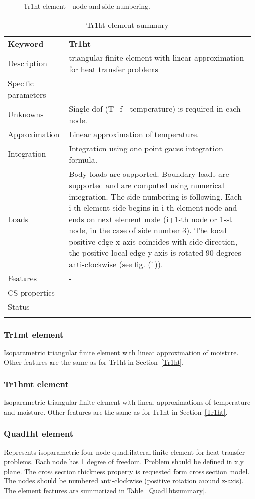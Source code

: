\documentclass[a4paper]{article}
\newcommand{\param}[1]{\texttt{#1}} %
\newcommand{\templabel}{}%
\newcommand{\tempcaption}{}%
\newcounter{nelpar}
\newenvironment{elementsummary}[5]{%
  \gdef\tempcaption{#4}%
  \gdef\templabel{#5}%
  \setcounter{nelpar}{0}%
  \begin{center} %
    \begin{table}[!htb] %
      \begin{tabular}{|l|p{9cm}|}\hline %
        {\bf Keyword} & \bf{#1}\\ %
        {Description} & {#2}\\ %
        {Specific parameters} & {#3}\\ \hline %
}{
  \\ \hline %
      \end{tabular}%
      \caption{\tempcaption}%
      \label{\templabel}%
    \end{table}%
  \end{center}%
}
\newcommand{\elementParam}[1]{%
  \ifthenelse{\value{nelpar}>0} %
             {&{#1}}%
             {\setcounter{nelpar}{1}Parameters&{#1}}%
             \\%
}
\newcommand{\elementDescription}[2]{{#1} & {#2}\\ }
\begin{document}
\begin{figure}[htb]
 \centering
 \begin{makeimage}
  
 \end{makeimage}
 \caption{Tr1ht element - node and side numbering.}
 \label{Tr1htfig}
\end{figure}

\begin{elementsummary}{Tr1ht}{triangular finite element with linear approximation for heat transfer problems}{-}{Tr1ht element summary}{Tr1htsummary}
\elementDescription{Unknowns}{Single dof (T\_f - temperature) is required in each node.}
\elementDescription{Approximation}{Linear approximation of temperature.}
\elementDescription{Integration}{Integration using one point gauss integration formula.}
\elementDescription{Loads}{Body loads are supported. Boundary loads are
supported and are computed  using numerical integration. The side numbering is
following. Each i-th element side begins in i-th element node and
ends on next element node (i+1-th node or 1-st node, in the case of 
side number 3). The local positive edge x-axis coincides with side
direction, the positive local edge y-axis is rotated 90 degrees
anti-clockwise (see fig. (\ref{Tr1htfig})).}
\elementDescription{Features}{-}
\elementDescription{CS properties}{-}
\elementDescription{Status}{}
\end{elementsummary}

\subsubsection{Tr1mt element}
Isoparametric triangular finite element with linear approximation of moisture.
Other features are the same as for Tr1ht in Section~\ref{Tr1ht}.

\subsubsection{Tr1hmt element}
Isoparametric triangular finite element with linear approximations of 
temperature and moisture. 
Other features are the same as for Tr1ht in Section~\ref{Tr1ht}.


\subsubsection{Quad1ht element}
\label{Quad1ht}
Represents isoparametric four-node quadrilateral finite element for
heat transfer problems. Each node has 1 degree of freedom.
Problem should be defined in x,y plane. The cross section thickness
property is requested form cross section model.
The nodes should be numbered anti-clockwise (positive rotation around
z-axis). The element features are summarized in Table~\ref{Quad1htsummary}.
\end{document}

